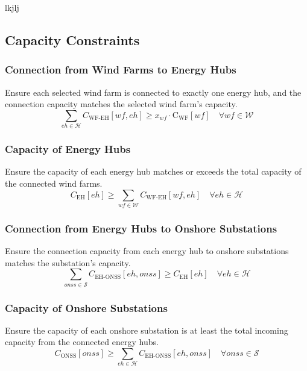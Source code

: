 lkjlj
\subsection*{Capacity Constraints}
\subsubsection*{Connection from Wind Farms to Energy Hubs}
Ensure each selected wind farm is connected to exactly one energy hub, and the connection capacity matches the selected wind farm's capacity.
\begin{equation}
    \sum_{eh \in \mathcal{H}} C_{\text{WF-EH}}[wf, eh] \geq x_{wf} \cdot \text{C}_{\text{WF}}[wf] \quad \forall wf \in \mathcal{W}
\end{equation}

\subsubsection*{Capacity of Energy Hubs}
Ensure the capacity of each energy hub matches or exceeds the total capacity of the connected wind farms.
\begin{equation}
    C_{\text{EH}}[eh] \geq \sum_{wf \in \mathcal{W}} C_{\text{WF-EH}}[wf, eh] \quad \forall eh \in \mathcal{H}
\end{equation}

\subsubsection*{Connection from Energy Hubs to Onshore Substations}
Ensure the connection capacity from each energy hub to onshore substations matches the substation's capacity.
\begin{equation}
    \sum_{onss \in \mathcal{S}} C_{\text{EH-ONSS}}[eh, onss] \geq C_{\text{EH}}[eh] \quad \forall eh \in \mathcal{H}
\end{equation}

\subsubsection*{Capacity of Onshore Substations}
Ensure the capacity of each onshore substation is at least the total incoming capacity from the connected energy hubs.
\begin{equation}
    C_{\text{ONSS}}[onss] \geq \sum_{eh \in \mathcal{H}} C_{\text{EH-ONSS}}[eh, onss] \quad \forall onss \in \mathcal{S}
\end{equation}

